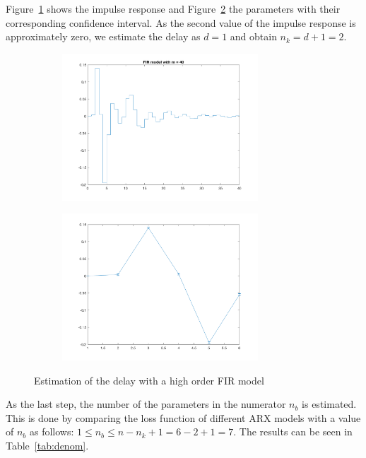 \documentclass{scrartcl}
\begin{document}
Figure~\ref{fig:fir40} shows the impulse response and Figure~\ref{fig:fir40_dev} the parameters with their corresponding confidence interval. As the second value of the impulse response is approximately zero, we estimate the delay as $d=1$ and obtain $n_k = d + 1 = 2$. 

\begin{figure}[h]
	\centering
	\begin{subfigure}{.49\textwidth}
		\includegraphics[height=5.5cm]{figures/fir40.png}
		\label{fig:fir40}
	\end{subfigure}\hfill
	\begin{subfigure}{.49\textwidth}
		\includegraphics[height=5.5cm]{figures/fir40_dev.png}
		\label{fig:fir40_dev}
	\end{subfigure}
	\caption{Estimation of the delay with a high order FIR model}
	\label{fig:delay}
\end{figure}

As the last step, the number of the parameters in the numerator $n_b$ is estimated. This is done by comparing the loss function of different ARX models with a value of $n_b$ as follows: $1 \leq n_b \leq n  - n_k + 1 = 6 - 2 + 1 = 7$. The results can be seen in Table~\ref{tab:denom}.
\end{document}
